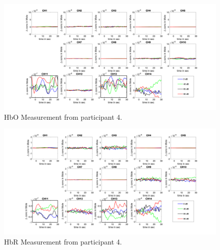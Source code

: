\begin{figure}[H]
  \centering
    \includegraphics[scale=.35]{bilder/HbO_Mole/sub_lin_s_HbO.png}
  \caption{HbO Measurement from participant 4.}
\end{figure}


\begin{figure}[H]
  \centering
    \includegraphics[scale=.35]{bilder/HbR_Mole/sub_lin_s_HbR.png}
  \caption{HbR Measurement from participant 4.}
\end{figure}

